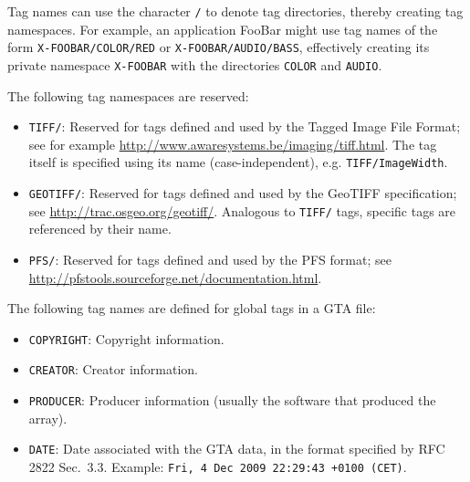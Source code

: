 \documentclass[a4paper,11pt]{article}
\newcommand{\code}[1]{\texttt{#1}}
\begin{document}
Tag names can use the character \code{/} to denote tag directories, thereby
creating tag namespaces. For example, an application FooBar might use tag
names of the form \code{X-FOOBAR/COLOR/RED} or \code{X-FOOBAR/AUDIO/BASS},
effectively creating its private namespace \code{X-FOOBAR} with the
directories \code{COLOR} and \code{AUDIO}.

The following tag namespaces are reserved:
\begin{itemize}
\item \code{TIFF/}: Reserved for tags defined and used by the Tagged Image
File Format; see for example
\url{http://www.awaresystems.be/imaging/tiff.html}. The tag itself is
specified using its name (case-independent), e.g. \code{TIFF/ImageWidth}.
\item \code{GEOTIFF/}: Reserved for tags defined and used by the
GeoTIFF specification; see \url{http://trac.osgeo.org/geotiff/}.
Analogous to \code{TIFF/} tags, specific tags are referenced by their name.
\item \code{PFS/}: Reserved for tags defined and used by the PFS format; 
see \url{http://pfstools.sourceforge.net/documentation.html}.
\end{itemize}

The following tag names are defined for global tags in a GTA file:
\begin{itemize}
\item \code{COPYRIGHT}: Copyright information.
\item \code{CREATOR}: Creator information.
\item \code{PRODUCER}: Producer information (usually the software that 
produced the array).
\item \code{DATE}: Date associated with the GTA data, in the format specified
by RFC 2822 Sec.~3.3. Example: \code{Fri,  4 Dec 2009 22:29:43 +0100 (CET)}.
\end{itemize}
\end{document}

